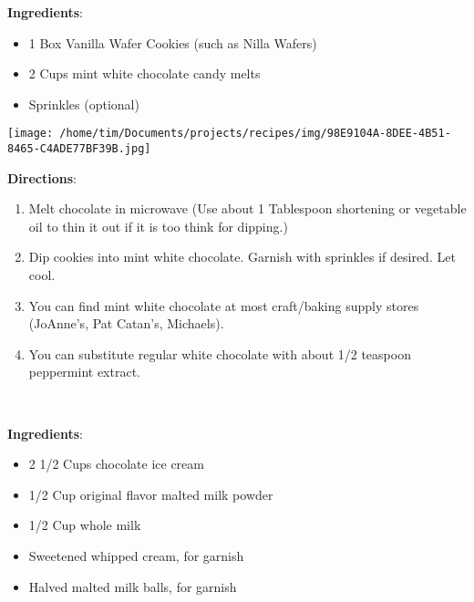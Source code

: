 \documentclass[11pt, twoside, openany]{book}
\begin{document}
\begin{minipage}[t]{0.8\linewidth}
\textbf{Ingredients}:\vspace{-3mm}
\begin{multicols}{2}
\begin{itemize}\setlength\itemsep{-1mm}
\item 1 Box Vanilla Wafer Cookies (such as Nilla Wafers)
\item 2 Cups mint white chocolate candy melts
\item Sprinkles (optional)
\end{itemize}
\end{multicols}
\end{minipage}
\begin{minipage}[t]{0.2\linewidth}
\centering \strut\vspace*{-\baselineskip}\newline
\texttt{[image: /home/tim/Documents/projects/recipes/img/98E9104A-8DEE-4B51-8465-C4ADE77BF39B.jpg]}\\
\end{minipage}\vspace{3mm}
\textbf{Directions}:
\vspace{-3mm}\begin{enumerate}\setlength\itemsep{-1mm}
\item Melt chocolate in microwave (Use about 1 Tablespoon shortening or vegetable oil to thin it out if it is too think for dipping.)
\item Dip cookies into mint white chocolate. Garnish with sprinkles if desired. Let cool.
\item You can find mint white chocolate at most craft/baking supply stores (JoAnne's, Pat Catan's, Michaels).
\item You can substitute regular white chocolate with about 1/2 teaspoon peppermint extract.
\end{enumerate}
 \label{chocolate-malted-milkshake}\hfill\textit{}\\
\begin{minipage}[t]{0.8\linewidth}
\textbf{Ingredients}:\vspace{-3mm}
\begin{multicols}{2}
\begin{itemize}\setlength\itemsep{-1mm}
\item 2 1/2 Cups chocolate ice cream
\item 1/2 Cup original flavor malted milk powder
\item 1/2 Cup whole milk
\item Sweetened whipped cream, for garnish
\item Halved malted milk balls, for garnish
\end{itemize}
\end{multicols}
\end{minipage}
\end{document}
